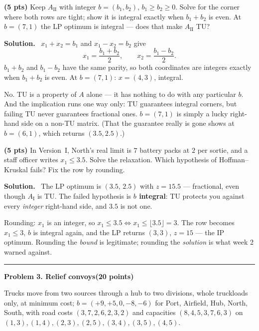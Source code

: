 \documentclass[10pt]{article}
\newcommand{\problem}[2]{%
  \par\bigskip
  {\color{ruleink}\rule{\textwidth}{1pt}}\par\nobreak\vspace{3pt}
  {\large\bfseries #2}\hfill{\normalsize\bfseries(#1 points)}\par\nobreak\vspace{4pt}}
\newenvironment{solution}
  {\par\smallskip\begingroup\color{solink}\textbf{Solution.}\ }
  {\endgroup\par}
\begin{document}
\begin{parts}
\item \textbf{(5 pts)} Keep $A_{\mathrm{II}}$ with integer $b = (b_1, b_2)$,
  $b_1 \ge b_2 \ge 0$. Solve for the corner where both rows are tight; show it is integral
  exactly when $b_1 + b_2$ is even. At $b = (7,1)$ the LP optimum is integral --- does that
  make $A_{\mathrm{II}}$ TU?

\begin{solution}
$x_1 + x_2 = b_1$ and $x_1 - x_2 = b_2$ give
\[
  x_1 = \frac{b_1 + b_2}{2}, \qquad x_2 = \frac{b_1 - b_2}{2} .
\]
$b_1 + b_2$ and $b_1 - b_2$ have the same parity, so both coordinates are integers exactly
when $b_1 + b_2$ is even. At $b = (7,1)$: $x = (4,3)$, integral.

No. TU is a property of $A$ alone --- it has nothing to do with any particular $b$. And the
implication runs one way only: TU guarantees integral corners, but failing TU never
guarantees fractional ones. $b = (7,1)$ is simply a lucky right-hand side on a non-TU
matrix. (That the guarantee really is gone shows at $b = (6,1)$, which returns $(3.5,2.5)$.)
\end{solution}

\item \textbf{(5 pts)} In Version~I, North's real limit is $7$ battery packs at $2$ per
  sortie, and a staff officer writes $x_1 \le 3.5$. Solve the relaxation. Which hypothesis
  of Hoffman--Kruskal fails? Fix the row by rounding.

\begin{solution}
The LP optimum is $(3.5,\, 2.5)$ with $z = 15.5$ --- fractional, even though
$A_{\mathrm{I}}$ is TU. The failed hypothesis is \textbf{$b$ integral}: TU protects you
against every \emph{integer} right-hand side, and $3.5$ is not one.

Rounding: $x_1$ is an integer, so $x_1 \le 3.5 \iff x_1 \le \lfloor 3.5 \rfloor = 3$. The
row becomes $x_1 \le 3$, $b$ is integral again, and the LP returns $(3,3)$, $z = 15$ --- the
IP optimum. Rounding the \emph{bound} is legitimate; rounding the \emph{solution} is what
week 2 warned against.
\end{solution}
\end{parts}

\problem{20}{Problem 3. Relief convoys}

Trucks move from two sources through a hub to two divisions, whole truckloads only, at
minimum cost; $b = (+9, +5, 0, -8, -6)$ for Port, Airfield, Hub, North, South, with road
costs $(3,7,2,6,2,3,2)$ and capacities $(8,4,5,3,7,6,3)$ on
$(1,3), (1,4), (2,3), (2,5), (3,4), (3,5), (4,5)$.
\end{document}
